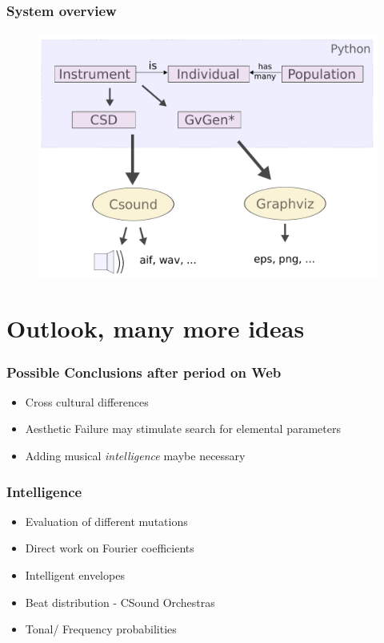 \documentclass{beamer}
\begin{document}
\begin{frame}
	\frametitle{System overview}
	\framesubtitle{}
        \begin{figure}[h]
          \centering
          \includegraphics[scale=0.3]{images/overview.pdf}
	\end{figure}
\end{frame}

\label{sg:sec:imple}




\section{Outlook, many more ideas} %
\label{sg:sec:outlook_many_more_ideas}
\begin{frame}
	\frametitle{Possible Conclusions after period on Web}
	\begin{itemize}
	\item<1-> Cross cultural differences 
	\item<2-> Aesthetic Failure may stimulate search for elemental parameters
	\item<3-> Adding musical \emph{intelligence} maybe necessary
	 \end{itemize}

\end{frame}
	
\begin{frame}
	\frametitle{Intelligence}
	\begin{itemize}
	\item<1-> Evaluation of different mutations
	\item<2-> Direct work on Fourier coefficients
	\item<3-> Intelligent envelopes
	\item<4-> Beat distribution - CSound Orchestras
	\item<5-> Tonal/ Frequency probabilities
	  \end{itemize}

\end{frame}
	
\end{document}
